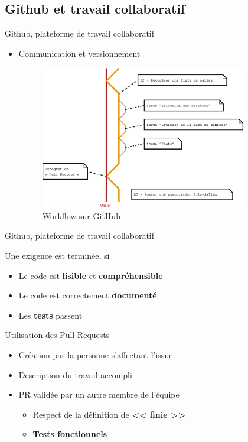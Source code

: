 \AntoineSpeak	
\subsection{Github  et travail collaboratif}	%
\begin{frame}{Github, plateforme de travail collaboratif} %
	\begin{itemize}
		\item Communication et versionnement
		\begin{figure}
			\centering
			\includegraphics[width=9cm]{./images/workflow_github}
			\caption{Workflow sur GitHub}
			\label{fig:workflow_github}
		\end{figure}
	\end{itemize}
\end{frame}

\begin{frame}{Github, plateforme de travail collaboratif} %
	\begin{block}{Une exigence est terminée, si}
		\begin{itemize}
			\item Le code est \textbf{lisible} et \textbf{compréhensible}
			\item Le code est correctement \textbf{documenté}
			\item Les \textbf{tests} passent \cmark
		\end{itemize} 
	\end{block}
	\pause

	\begin{block}{Utilisation des Pull Requests}
		\begin{itemize}
			\item Création par la personne s'affectant l'issue
			\item Description du travail accompli
			\item PR validée par un autre membre de l'équipe
				\begin{itemize}
					\item Respect de la définition de \textbf{<< finie >>}
					\item \textbf{Tests fonctionnels} \cmark
				\end{itemize}
		\end{itemize}
	\end{block}
\end{frame}


